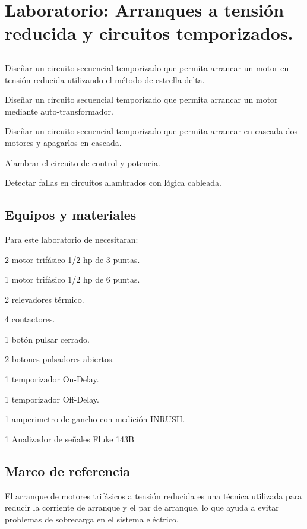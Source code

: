 \chapter{Laboratorio:  Arranques a tensión reducida y circuitos temporizados.}

\section{\obj}
\capacidad
\begin{itemize}
	{\small
	 \item Diseñar un circuito secuencial temporizado que permita arrancar un motor en tensión reducida utilizando el método de estrella delta.
    \item  Diseñar un circuito secuencial temporizado que permita arrancar un motor mediante auto-transformador.
    \item  Diseñar un circuito secuencial temporizado que permita arrancar en cascada dos motores y apagarlos en cascada. 
	 \item Alambrar el circuito de control y potencia.
	 \item Detectar fallas en circuitos alambrados con lógica cableada.
	 
 }
\end{itemize} 

 
\section{Equipos y materiales}
Para este laboratorio de necesitaran:
\begin{itemize}
	{\small \item 2 motor trifásico 1/2 hp de 3 puntas.
	\item 1 motor trifásico 1/2 hp de 6 puntas.
	\item 2 relevadores térmico.
	\item 4 contactores.
	\item 1 botón pulsar cerrado.
	\item 2 botones pulsadores abiertos.
	\item 1 temporizador On-Delay.
	\item 1 temporizador Off-Delay.
	\item 1 amperimetro de gancho con medición INRUSH.
	\item 1 Analizador de señales Fluke 143B
}
\end{itemize}

\section{Marco de referencia}
El arranque de motores trifásicos a tensión reducida es una técnica utilizada para reducir la corriente de arranque y el par de arranque, lo que ayuda a evitar problemas de sobrecarga en el sistema eléctrico.


